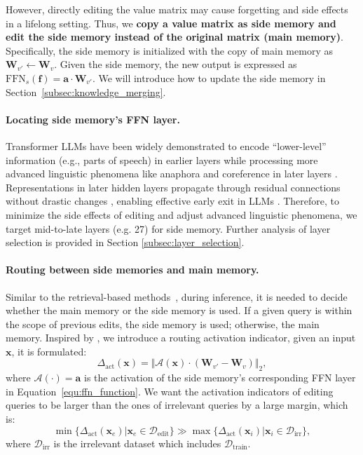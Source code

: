 \documentclass{article}
\begin{document}
However, directly editing the value matrix may cause forgetting and side effects in a lifelong setting. 
Thus, we \textbf{copy a value matrix as side memory and edit the side memory instead of the original matrix (main memory)}.
Specifically, the side memory is initialized with the copy of main memory as $\mathbf{W}_{v'} \leftarrow \mathbf{W}_{v}$. 
Given the side memory, the new output is expressed as $\text{FFN}_{s}(\mathbf{f}) = \mathbf{a} \cdot \mathbf{W}_{v'}$. 
We will introduce how to update the side memory in Section~\ref{subsec:knowledge_merging}.

\paragraph{Locating side memory's FFN layer.} \label{subsec:locating_side_memory}
Transformer LLMs have been widely demonstrated to encode  ``lower-level'' information (e.g., parts of speech) in earlier layers while processing more advanced linguistic phenomena like anaphora and coreference in later layers \cite{early_layer_1,early_layer_2,early_layer_3}.
Representations in later hidden layers propagate through residual connections without drastic changes \cite{dola, rome}, enabling effective early exit in LLMs \cite{shortgpt, confident_adaptive}.
Therefore, to minimize the side effects of editing and adjust advanced linguistic phenomena, we target mid-to-late layers (e.g. 27) for side memory. Further analysis of layer selection is provided in Section \ref{subsec:layer_selection}.



\paragraph{Routing between side memories and main memory.} 
Similar to the retrieval-based methods~\cite{grace,serac}, during inference, it is needed to decide whether the main memory or the side memory is used. If a given query is within the scope of previous edits, the side memory is used; otherwise, the main memory. 
Inspired by \cite{t-patcher}, we introduce a routing activation indicator, given an input $\mathbf{x}$, it is formulated:
\begin{equation}
    \Delta_{\text{act}}(\mathbf{x}) = \Vert \mathcal{A}(\mathbf{x}) \cdot (\mathbf{W}_{v'} - \mathbf{W}_v) \Vert_2, 
    \label{equ:routing_activation}
\end{equation}
where $\mathcal{A}(\cdot) = \mathbf{a}$ is the activation of the side memory's corresponding FFN layer in Equation~\ref{equ:ffn_function}. We want the activation indicators of editing queries to be larger than the ones of irrelevant queries by a large margin, which is:
\begin{equation}
    \min \{\Delta_{\text{act}}(\mathbf{x}_e)| \mathbf{x}_e \in \mathcal{D}_{\text{edit}}\} \gg \max \{\Delta_{\text{act}}(\mathbf{x}_i)| \mathbf{x}_i \in \mathcal{D}_{\text{irr}}\},
\end{equation}
where $\mathcal{D}_{\text{irr}}$ is the irrelevant dataset which includes $\mathcal{D}_{\text{train}}$. 
\end{document}
